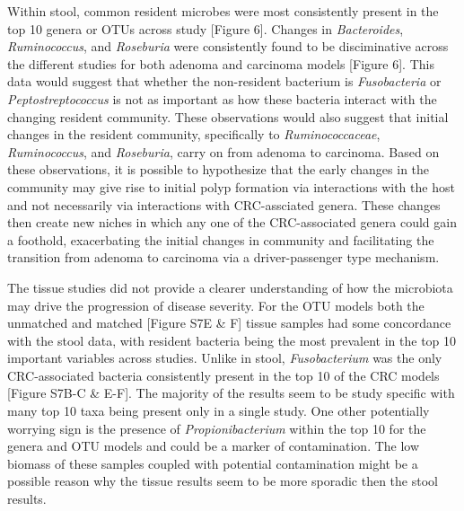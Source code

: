 \documentclass[12pt,]{article}
\begin{document}
Within stool, common resident microbes were most consistently present in
the top 10 genera or OTUs across study {[}Figure 6{]}. Changes in
\emph{Bacteroides}, \emph{Ruminococcus}, and \emph{Roseburia} were
consistently found to be disciminative across the different studies for
both adenoma and carcinoma models {[}Figure 6{]}. This data would
suggest that whether the non-resident bacterium is \emph{Fusobacteria}
or \emph{Peptostreptococcus} is not as important as how these bacteria
interact with the changing resident community. These observations would
also suggest that initial changes in the resident community,
specifically to \emph{Ruminococcaceae}, \emph{Ruminococcus}, and
\emph{Roseburia}, carry on from adenoma to carcinoma. Based on these
observations, it is possible to hypothesize that the early changes in
the community may give rise to initial polyp formation via interactions
with the host and not necessarily via interactions with CRC-assciated
genera. These changes then create new niches in which any one of the
CRC-associated genera could gain a foothold, exacerbating the initial
changes in community and facilitating the transition from adenoma to
carcinoma via a driver-passenger type mechanism.

The tissue studies did not provide a clearer understanding of how the
microbiota may drive the progression of disease severity. For the OTU
models both the unmatched and matched {[}Figure S7E \& F{]} tissue
samples had some concordance with the stool data, with resident bacteria
being the most prevalent in the top 10 important variables across
studies. Unlike in stool, \emph{Fusobacterium} was the only
CRC-associated bacteria consistently present in the top 10 of the CRC
models {[}Figure S7B-C \& E-F{]}. The majority of the results seem to be
study specific with many top 10 taxa being present only in a single
study. One other potentially worrying sign is the presence of
\emph{Propionibacterium} within the top 10 for the genera and OTU models
and could be a marker of contamination. The low biomass of these samples
coupled with potential contamination might be a possible reason why the
tissue results seem to be more sporadic then the stool results.
\end{document}
